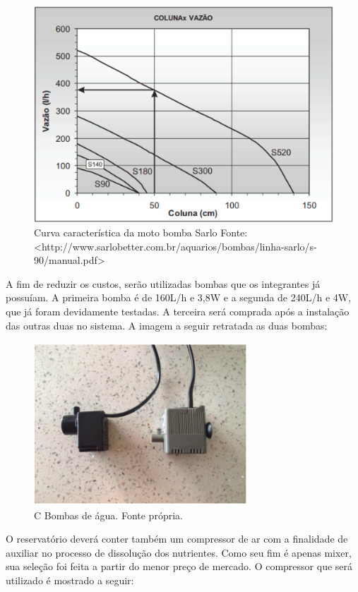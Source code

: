 \begin{figure}[H]
	\centering
	\includegraphics[width=13cm]{figuras/coluna.png}
	\caption{Curva característica da moto bomba Sarlo  Fonte: <http://www.sarlobetter.com.br/aquarios/bombas/linha-sarlo/s-90/manual.pdf>}
	\label{coluna}
\end{figure}

A fim de reduzir os custos, serão utilizadas bombas que os integrantes já possuíam. A primeira bomba é de 160L/h e 3,8W e a segunda de 240L/h e 4W, que já foram devidamente testadas. A terceira será comprada após a instalação das outras duas no sistema. A imagem a seguir retratada as duas bombas:

\begin{figure}[H]
	\centering
	\includegraphics[width=8cm]{figuras/bombas.png}
	\caption{C Bombas de água. Fonte própria.}
	\label{coluna}
\end{figure}

O reservatório deverá conter também um compressor de ar com a finalidade de auxiliar no processo de dissolução dos nutrientes. Como seu fim é apenas mixer, sua seleção foi feita a partir do menor preço de mercado. O compressor que será utilizado é mostrado a seguir:

